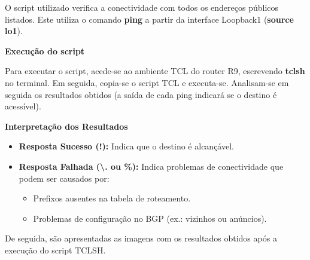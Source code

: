 \documentclass[11pt,english, openright, oneside]{book}
\begin{document}
O script utilizado verifica a conectividade com todos os endereços públicos listados. Este utiliza o comando \textbf{ping} a partir da interface Loopback1 (\textbf{source lo1}). \par \vspace{0.8cm}

\textbf{Execução do script} \par 
Para executar o script, acede-se ao ambiente TCL do router R9, escrevendo \textbf{tclsh} no terminal. Em seguida, copia-se o script TCL e executa-se. Analisam-se em seguida os resultados obtidos (a saída de cada ping indicará se o destino é acessível). \par \vspace{0.8cm}

\textbf{Interpretação dos Resultados}
\begin{itemize}
  \item \textbf{Resposta Sucesso (!):} Indica que o destino é alcançável.
  \item \textbf{Resposta Falhada (\textbackslash. ou \%):} Indica problemas de conectividade que podem ser causados por:
  \begin{itemize}
    \item Prefixos ausentes na tabela de roteamento.
    \item Problemas de configuração no BGP (ex.: vizinhos ou anúncios).
  \end{itemize}
\end{itemize} \par \vspace{0.8cm}

De seguida, são apresentadas as imagens com os resultados obtidos após a execução do script TCLSH. \par
\end{document}
